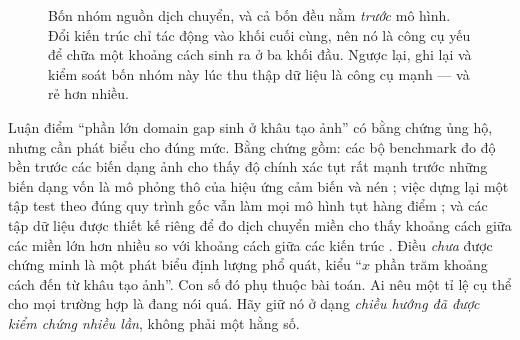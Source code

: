 \documentclass[../../../deep_learning.tex]{subfiles}
\begin{document}
\begin{figure}[H]\centering
{}
\caption{Bốn nhóm nguồn dịch chuyển, và cả bốn đều nằm \emph{trước} mô hình. Đổi kiến trúc chỉ tác động vào khối cuối cùng, nên nó là công cụ yếu để chữa một khoảng cách sinh ra ở ba khối đầu. Ngược lại, ghi lại và kiểm soát bốn nhóm này lúc thu thập dữ liệu là công cụ mạnh --- và rẻ hơn nhiều.}
\label{fig:nguon-domain-gap}
\end{figure}

Luận điểm ``phần lớn domain gap sinh ở khâu tạo ảnh'' có bằng chứng ủng hộ, nhưng cần phát biểu cho đúng mức. Bằng chứng gồm: các bộ benchmark đo độ bền trước các biến dạng ảnh cho thấy độ chính xác tụt rất mạnh trước những biến dạng vốn là mô phỏng thô của hiệu ứng cảm biến và nén \cite{hendrycks2019benchmarking}; việc dựng lại một tập test theo đúng quy trình gốc vẫn làm mọi mô hình tụt hàng điểm \cite{recht2019imagenet}; và các tập dữ liệu được thiết kế riêng để đo dịch chuyển miền cho thấy khoảng cách giữa các miền lớn hơn nhiều so với khoảng cách giữa các kiến trúc \cite{koh2021wilds}. Điều \emph{chưa} được chứng minh là một phát biểu định lượng phổ quát, kiểu ``\(x\) phần trăm khoảng cách đến từ khâu tạo ảnh''. Con số đó phụ thuộc bài toán. Ai nêu một tỉ lệ cụ thể cho mọi trường hợp là đang nói quá. Hãy giữ nó ở dạng \emph{chiều hướng đã được kiểm chứng nhiều lần}, không phải một hằng số.
\end{document}
